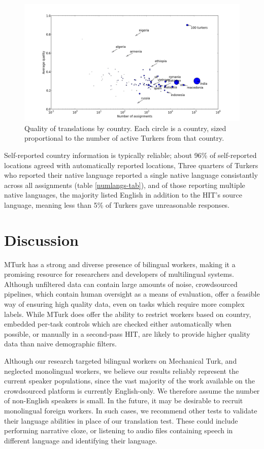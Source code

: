 \documentclass[11pt]{article}
\begin{document}
\begin{figure}[h]
\centering
\includegraphics[width=6in]{figures/quality-scatter-avgturkers-country-labeled}
\caption{Quality of translations by country. Each circle is a country, sized proportional to the number of active Turkers from that country.}
\label{quality-scatter}
\end{figure}

Self-reported country information is typically reliable; about 96\% of self-reported locations agreed with automatically reported locations, 
Three quarters of Turkers who reported their native language reported a single native language consistantly across all assignments (table \ref{numlangs-tab}), and of those reporting multiple native languages, the majority listed English in addition to the HIT's source language, meaning less than 5\% of Turkers gave unreasonable responses.  

\section{Discussion}
MTurk has a strong and diverse presence of bilingual workers, making it a promising resource for researchers and developers of multilingual systems. Although unfiltered data can contain large amounts of noise, crowdsourced pipelines, which contain human oversight as a means of evaluation, offer a feasible way of ensuring high quality data, even on tasks which require more complex labels. While MTurk does offer the ability to restrict workers based on country, embedded per-task controls which are checked either automatically when possible, or manually in a second-pass HIT, are likely to provide higher quality data than naive demographic filters. 

Although our research targeted bilingual workers on Mechanical Turk, and neglected monolingual workers, we believe our results reliably represent the current speaker populations, since the vast majority of the work available on the crowdsourced platform is currently English-only.  We therefore assume the number of non-English speakers is small.  In the future, it may be desirable to recruit monolingual foreign workers.  In such cases, we recommend other tests to validate their language abilities in place of our translation test.  These could include performing narrative cloze, or listening to audio files containing speech in different language and identifying their language. 




\end{document}
